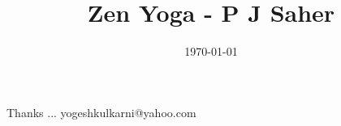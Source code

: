 \documentclass[xcolor=dvipsnames,compress,t,pdf]{beamer}
\title[Zen Yoga \hspace{4cm} \insertframenumber /\inserttotalframenumber]
{Zen Yoga - P J Saher}
\subtitle[]{}
\date[2019]{\today}
\begin{document}
\begin{frame}
\titlepage
\end{frame}




\begin{frame}[c]{}
Thanks ...
\vspace{5mm}
yogeshkulkarni@yahoo.com
\end{frame}
\end{document}

